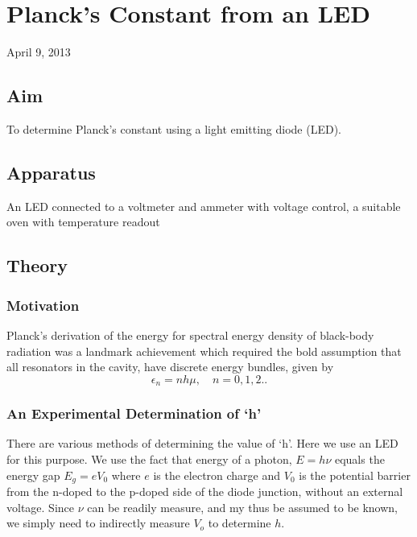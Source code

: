 \chapter{Planck's Constant from an LED}
\begin{flushright}
April 9, 2013
\end{flushright}
\section{Aim}
	To determine Planck's constant using a light emitting diode (LED).
\section{Apparatus}
	An LED connected to a voltmeter and ammeter with voltage control, a suitable oven with temperature readout
\section{Theory}
	\subsection{Motivation}
		Planck's derivation of the energy for spectral energy density of black-body radiation was a landmark achievement which required the bold assumption that all resonators in the cavity, have discrete energy bundles, given by 
		\begin{equation}
			\epsilon_n = nh\mu, \quad n=0,1,2..
		\end{equation}
	\subsection{An Experimental Determination of `h'}
		There are various methods of determining the value of `h'. Here we use an LED for this purpose. We use the fact that energy of a photon, $E=h\nu$ equals the energy gap $E_g=eV_0$ where $e$ is the electron charge and $V_0$ is the potential barrier from the n-doped to the p-doped side of the diode junction, without an external voltage. Since $\nu$ can be readily measure, and my thus be assumed to be known, we simply need to indirectly measure $V_o$ to determine $h$.
		\par

